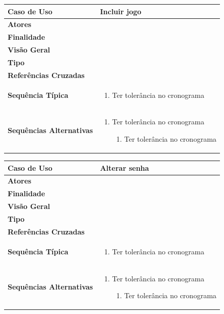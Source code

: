 \documentclass[a4paper,11pt]{article}
\begin{document}
\begin{table}[H]
		\begin{tabularx}{\textwidth}{|l|X|}
		\hline
			\textbf{Caso de Uso} &  Incluir jogo \\ \hline
			\textbf{Atores} &    \\ \hline
			\textbf{Finalidade} &   \\ \hline
			\textbf{Visão Geral} &  \\ \hline
			\textbf{Tipo} &  \\ \hline
			\textbf{Referências Cruzadas} &  \\ \hline
			\textbf{Sequência Típica} & 
			\begin{enumerate}
			\item Ter tolerância no cronograma
			\end{enumerate} \\ \hline
			\textbf{Sequências Alternativas} & 
			\begin{enumerate}
			\item Ter tolerância no cronograma
			\begin{enumerate}
			\item Ter tolerância no cronograma
			\end{enumerate}
			\end{enumerate} \\ \hline
		\end{tabularx}
\end{table}

\begin{table}[H]
		\begin{tabularx}{\textwidth}{|l|X|}
		\hline
			\textbf{Caso de Uso} &  Alterar senha \\ \hline
			\textbf{Atores} &    \\ \hline
			\textbf{Finalidade} &   \\ \hline
			\textbf{Visão Geral} &  \\ \hline
			\textbf{Tipo} &  \\ \hline
			\textbf{Referências Cruzadas} &  \\ \hline
			\textbf{Sequência Típica} & 
			\begin{enumerate}
			\item Ter tolerância no cronograma
			\end{enumerate} \\ \hline
			\textbf{Sequências Alternativas} & 
			\begin{enumerate}
			\item Ter tolerância no cronograma
			\begin{enumerate}
			\item Ter tolerância no cronograma
			\end{enumerate}
			\end{enumerate} \\ \hline
		\end{tabularx}
\end{table}
\end{document}
